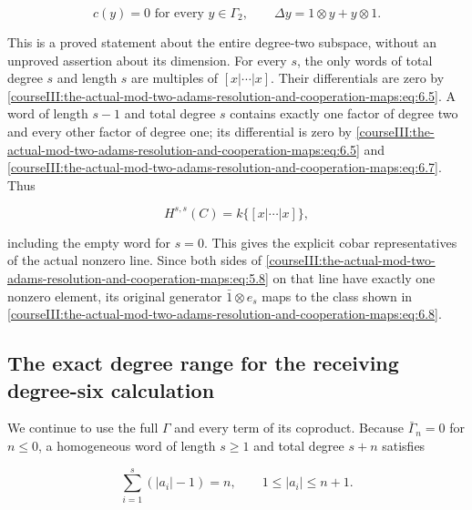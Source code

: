\begin{equation}
c(y)=0\text{ for every }y\in\Gamma_2,
 \qquad \Delta y=1\otimes y+y\otimes1.
 \label{courseIII:the-actual-mod-two-adams-resolution-and-cooperation-maps:eq:6.7}
\end{equation}

This is a proved statement about the entire degree-two subspace, without an unproved assertion about its dimension. For every \(s\), the only words of total degree \(s\) and length \(s\) are multiples of \([x|\cdots|x]\). Their differentials are zero by \eqref{courseIII:the-actual-mod-two-adams-resolution-and-cooperation-maps:eq:6.5}. A word of length \(s-1\) and total degree \(s\) contains exactly one factor of degree two and every other factor of degree one; its differential is zero by \eqref{courseIII:the-actual-mod-two-adams-resolution-and-cooperation-maps:eq:6.5} and \eqref{courseIII:the-actual-mod-two-adams-resolution-and-cooperation-maps:eq:6.7}. Thus

\begin{equation}
H^{s,s}(C)=k\{[x|\cdots|x]\},
 \label{courseIII:the-actual-mod-two-adams-resolution-and-cooperation-maps:eq:6.8}
\end{equation}

including the empty word for \(s=0\). This gives the explicit cobar representatives of the actual nonzero line. Since both sides of \eqref{courseIII:the-actual-mod-two-adams-resolution-and-cooperation-maps:eq:5.8} on that line have exactly one nonzero element, its original generator \(\bar1\otimes e_s\) maps to the class shown in \eqref{courseIII:the-actual-mod-two-adams-resolution-and-cooperation-maps:eq:6.8}.

\subsection{The exact degree range for the receiving degree-six calculation}
\label{courseIII:the-actual-mod-two-adams-resolution-and-cooperation-maps:cooperation-degree-range}

\label{courseIII:the-actual-mod-two-adams-resolution-and-cooperation-maps:section-7}\label{courseIII:actual-resolution:7}

We continue to use the full \(\Gamma\) and every term of its coproduct. Because \(\bar\Gamma_n=0\) for \(n\leq0\), a homogeneous word of length \(s\geq1\) and total degree \(s+n\) satisfies

\begin{equation}
\sum_{i=1}^s(|a_i|-1)=n,
 \qquad 1\leq |a_i|\leq n+1.
 \label{courseIII:the-actual-mod-two-adams-resolution-and-cooperation-maps:eq:7.1}
\end{equation}

